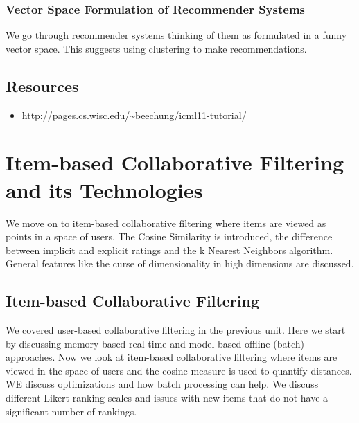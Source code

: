 \subsubsection{Vector Space Formulation of Recommender
Systems}

We go through recommender systems thinking of them as formulated in a
funny vector space. This suggests using clustering to make
recommendations.



\subsection{Resources}

\begin{itemize}

\item
  \url{http://pages.cs.wisc.edu/~beechung/icml11-tutorial/}
\end{itemize}

\section{Item-based Collaborative Filtering and its Technologies}

We move on to item-based collaborative filtering where items are viewed
as points in a space of users. The Cosine Similarity is introduced, the
difference between implicit and explicit ratings and the k Nearest
Neighbors algorithm. General features like the curse of dimensionality
in high dimensions are discussed.



\subsection{Item-based Collaborative Filtering}

We covered user-based collaborative filtering in the previous unit. Here
we start by discussing memory-based real time and model based offline
(batch) approaches. Now we look at item-based collaborative filtering
where items are viewed in the space of users and the cosine measure is
used to quantify distances. WE discuss optimizations and how batch
processing can help. We discuss different Likert ranking scales and
issues with new items that do not have a significant number of rankings.

